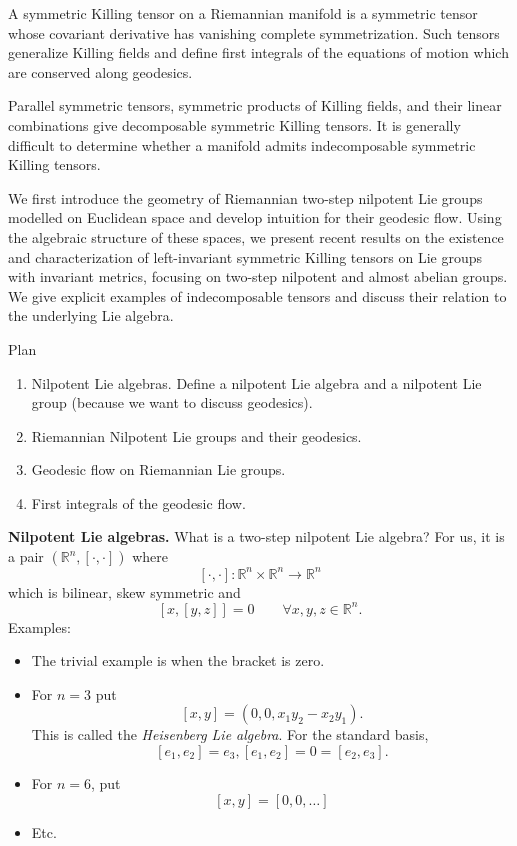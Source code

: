 A symmetric Killing tensor on a
Riemannian manifold is a symmetric tensor
whose covariant derivative has vanishing
complete symmetrization. Such tensors
generalize Killing fields and define first
integrals of the equations of motion which
are conserved along geodesics.

Parallel symmetric tensors, symmetric
products of Killing fields, and their
linear combinations give decomposable
symmetric Killing tensors. It is generally
difficult to determine whether a manifold
admits indecomposable symmetric Killing
tensors.

We first introduce the geometry of
Riemannian two-step nilpotent Lie groups
modelled on Euclidean space and develop
intuition for their geodesic flow. Using
the algebraic structure of these spaces,
we present recent results on the existence
and characterization of left-invariant
symmetric Killing tensors on Lie groups
with invariant metrics, focusing on
two-step nilpotent and almost abelian
groups. We give explicit examples of
indecomposable tensors and discuss their
relation to the underlying Lie algebra.

\medskip\noindent
Plan
\begin{enumerate}
\item Nilpotent Lie algebras.
Define a nilpotent Lie algebra
and a nilpotent Lie group (because
we want to discuss geodesics).
\item Riemannian Nilpotent Lie groups and
their geodesics.
\item Geodesic flow on Riemannian Lie groups.
\item First integrals of the geodesic
flow.
\end{enumerate}

\medskip\noindent
{\bf Nilpotent Lie algebras.}
What is a two-step nilpotent Lie algebra?
For us, it is a pair $(\mathbb{R}^n,
[\cdot,\cdot])$ where
$$
[\cdot,\cdot]:\mathbb{R}^n\times \mathbb{R}^n
\to \mathbb{R}^n
$$
which is bilinear, skew symmetric and
$$
[x,[y,z]]=0 \qquad \forall x,y,z \in
\mathbb{R}^n.
$$
Examples:
\begin{itemize}
\item The trivial example is when the bracket
is zero.

\item For $n=3$ put
$$
[x,y]=(0,0,x_1y_2-x_2y_1).
$$
This is called the {\it Heisenberg Lie
algebra}. For the standard basis,
$$
[e_1,e_2]=e_3,[e_1,e_2]=0=[e_2,e_3].
$$
\item For $n=6$, put
$$
[x,y]=[0,0,…]
$$

\item Etc.
\end{itemize}

